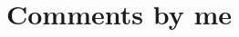\documentclass[
10pt, %
a4paper, %
twocolumn, %
landscape %
]{article}
\begin{document}
\section*{Comments by me}



\end{document}
